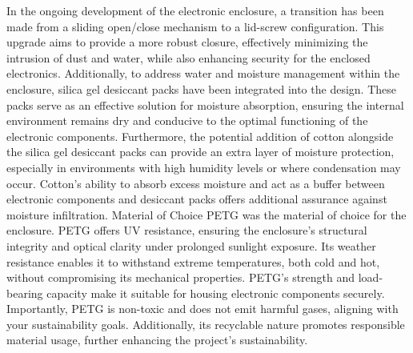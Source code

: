 \documentclass[class=report,11pt,crop=false]{standalone}
\begin{document}
In the ongoing development of the electronic enclosure, a transition has been made from a sliding open/close mechanism to a lid-screw configuration. This upgrade aims to provide a more robust closure, effectively minimizing the intrusion of dust and water, while also enhancing security for the enclosed electronics.
Additionally, to address water and moisture management within the enclosure, silica gel desiccant packs have been integrated into the design. These packs serve as an effective solution for moisture absorption, ensuring the internal environment remains dry and conducive to the optimal functioning of the electronic components. Furthermore, the potential addition of cotton alongside the silica gel desiccant packs can provide an extra layer of moisture protection, especially in environments with high humidity levels or where condensation may occur. Cotton's ability to absorb excess moisture and act as a buffer between electronic components and desiccant packs offers additional assurance against moisture infiltration.
Material of Choice
PETG was the material of choice for the enclosure. PETG offers UV resistance, ensuring the enclosure's structural integrity and optical clarity under prolonged sunlight exposure. Its weather resistance enables it to withstand extreme temperatures, both cold and hot, without compromising its mechanical properties. PETG's strength and load-bearing capacity make it suitable for housing electronic components securely. Importantly, PETG is non-toxic and does not emit harmful gases, aligning with your sustainability goals. Additionally, its recyclable nature promotes responsible material usage, further enhancing the project's sustainability. 
\end{document}
